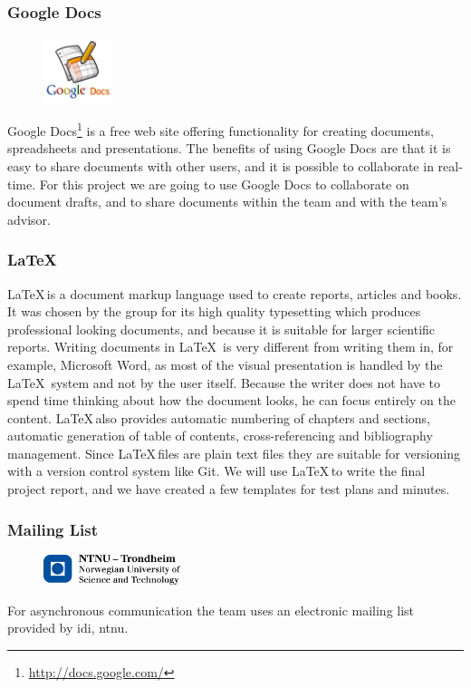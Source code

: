 \subsubsection{Google Docs}
\begin{figure}
	\vspace{-20pt}
	\includegraphics[width=2cm]{./planning/img/google_docs_logo}
	\vspace{-20pt}
\end{figure}
Google Docs\footnote{\url{http://docs.google.com/}} is a free web site offering
functionality for creating documents, spreadsheets and presentations.
The benefits of using Google Docs are that it is easy to share documents with other users, and
it is possible to collaborate in real-time. For this project we are going to use Google Docs
to collaborate on document drafts, and to share documents within the team and
with the team's advisor.

\subsubsection{\LaTeX}
\LaTeX \,is a document \gls{markup language} used to
create reports, articles and books. It was chosen by the group for its 
high quality typesetting which produces professional looking documents, and 
because it is suitable for larger scientific reports.\cite{NotSoShorGuideToLatex} 
Writing documents in \LaTeX \ is very different from writing them in, for example,
Microsoft Word, as most of the visual presentation is handled by the \LaTeX \ system 
and not by the user itself. Because the writer does not have to spend time
thinking about how the document looks, he can focus entirely on the content.
\LaTeX \,also provides automatic numbering of chapters and sections,
automatic generation of table of contents, cross-referencing and bibliography
management. Since \LaTeX \,files are plain text files they are suitable for versioning 
with a \gls{version control system} like Git. We will use \LaTeX \,to write the final project 
report, and we have created a few templates for test plans and minutes.

\subsubsection{Mailing List}
\begin{figure}
	\vspace{-20pt}
	\includegraphics[width=4cm]{./planning/img/ntnu_logo}
	\vspace{-20pt}
\end{figure}
For asynchronous communication the team uses an electronic mailing list
provided by \Gls{idi}, \Gls{ntnu}.

